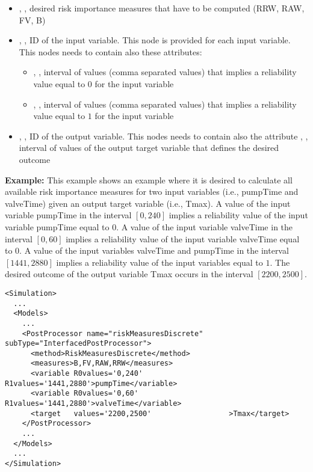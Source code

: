 \begin{itemize}
   \item {}, , desired risk importance measures that have to be computed (RRW, RAW, FV, B)
   \item {}, , ID of the input variable. This node is provided for each input variable. This nodes needs to contain also these attributes:
     \begin{itemize}
       \item {}, , interval of values (comma separated values) that implies a reliability value equal to $0$ for the input variable
       \item {}, , interval of values (comma separated values) that implies a reliability value equal to $1$ for the input variable
     \end{itemize}
   \item {}, , ID of the output variable. This nodes needs to contain also the attribute , , interval of
                                                             values of the output target variable that defines the desired outcome
\end{itemize}

\textbf{Example:}
This example shows an example where it is desired to calculate all available risk importance measures for two input variables (i.e., pumpTime and valveTime)
given an output target variable (i.e., Tmax).
A value of the input variable pumpTime in the interval $[0,240]$ implies a reliability value of the input variable pumpTime equal to $0$.
A value of the input variable valveTime in the interval $[0,60]$ implies a reliability value of the input variable valveTime equal to $0$.
A value of the input variables valveTime and pumpTime in the interval $[1441,2880]$ implies a reliability value of the input variables equal to $1$.
The desired outcome of the output variable Tmax occurs in the interval $[2200,2500]$.
\begin{lstlisting}[style=XML,morekeywords={subType,debug,name,class,type}]
<Simulation>
  ...
  <Models>
    ...
    <PostProcessor name="riskMeasuresDiscrete" subType="InterfacedPostProcessor">
      <method>RiskMeasuresDiscrete</method>
      <measures>B,FV,RAW,RRW</measures>
      <variable R0values='0,240' R1values='1441,2880'>pumpTime</variable>
      <variable R0values='0,60'  R1values='1441,2880'>valveTime</variable>
      <target   values='2200,2500'                  >Tmax</target>
    </PostProcessor>
    ...
  </Models>
  ...
</Simulation>
\end{lstlisting}

